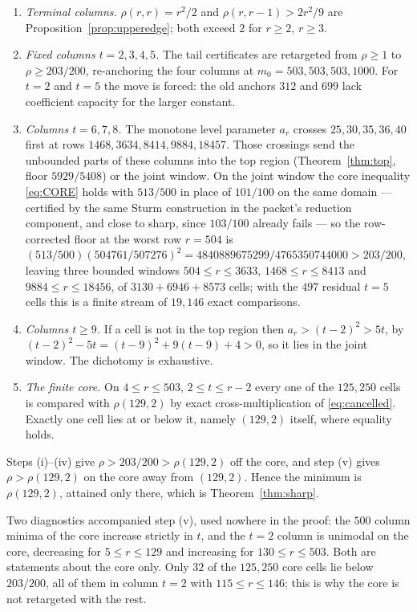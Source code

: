 \documentclass[11pt,a4paper]{article}
\theoremstyle{plain}
\theoremstyle{definition}
\theoremstyle{remark}
\begin{document}
\begin{enumerate}[label=\textup{(\roman*)},leftmargin=2.4em]
\item \emph{Terminal columns.} $\rho(r,r)=r^2/2$ and $\rho(r,r-1)>2r^2/9$ are
  Proposition~\ref{prop:upperedge}; both exceed $2$ for $r\ge2$, $r\ge3$.
\item \emph{Fixed columns $t=2,3,4,5$.} The tail certificates are retargeted
  from $\rho\ge1$ to $\rho\ge203/200$, re-anchoring the four columns at
  $m_0=503,503,503,1000$. For $t=2$ and $t=5$ the move is forced: the old
  anchors $312$ and $699$ lack coefficient capacity for the larger constant.
\item \emph{Columns $t=6,7,8$.} The monotone level parameter $a_r$ crosses
  $25,30,35,36,40$ first at rows $1468,3634,8414,9884,18457$. Those crossings
  send the unbounded parts of these columns into the top region
  (Theorem~\ref{thm:top}, floor $5929/5408$) or the joint window. On the
  joint window the core inequality \eqref{eq:CORE} holds with $513/500$ in
  place of $101/100$ on the same domain — certified by the same Sturm
  construction in the packet's reduction component, and close to sharp, since
  $103/100$ already fails — so the row-corrected floor at the worst row
  $r=504$ is
  $(513/500)(504761/507276)^2=4840889675299/4765350744000>203/200$, leaving three
  bounded windows $504\le r\le3633$, $1468\le r\le8413$ and
  $9884\le r\le18456$, of $3130+6946+8573$ cells; with the $497$ residual $t=5$
  cells this is a finite stream of $19{,}146$ exact comparisons.
\item \emph{Columns $t\ge9$.} If a cell is not in the top region then
  $a_r>(t-2)^2>5t$, by $(t-2)^2-5t=(t-9)^2+9(t-9)+4>0$, so it lies in the joint
  window. The dichotomy is exhaustive.
\item \emph{The finite core.} On $4\le r\le503$, $2\le t\le r-2$ every one of
  the $125{,}250$ cells is compared with $\rho(129,2)$ by exact
  cross-multiplication of \eqref{eq:cancelled}. Exactly one cell lies at or
  below it, namely $(129,2)$ itself, where equality holds.
\end{enumerate}

Steps (i)--(iv) give $\rho>203/200>\rho(129,2)$ off the core, and step (v) gives
$\rho>\rho(129,2)$ on the core away from $(129,2)$. Hence the minimum is
$\rho(129,2)$, attained only there, which is Theorem~\ref{thm:sharp}.

Two diagnostics accompanied step (v), used nowhere in the proof: the
$500$ column minima of the core increase strictly in $t$, and the $t=2$
column is unimodal on the core, decreasing for $5\le r\le129$ and increasing
for $130\le r\le503$. Both are statements about the core only. Only $32$ of the
$125{,}250$ core cells lie below $203/200$, all of them in column $t=2$ with
$115\le r\le146$; this is why the core is not retargeted with the rest.
\end{document}
